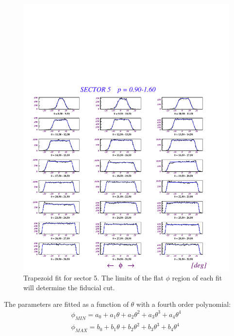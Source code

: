 \begin{figure}[tbp]
 \begin{center}
 \includegraphics[width = 16cm, bb=0 0 560 560]{data_reduction/img/traped_fit_s5}  
  \caption[Trapezoid fit for sector 5]
          { Trapezoid fit for sector 5. The limits of the flat $\phi$ region of each fit
                     will determine the fiducial cut.}
 \label{fig:traped_fit_s5}
 \end{center}
\end{figure}

\cia


The parameters are fitted as a function 
of $\theta$ with a fourth order polynomial:
$$
\begin{array}{c}
 \phi_{MIN} = a_0 + a_1\theta + a_2\theta^2 + a_3\theta^3 + a_4\theta^4 \\
 \phi_{MAX} = b_0 + b_1\theta + b_2\theta^2 + b_3\theta^3 + b_4\theta^4 \\ 
\end{array}
$$

